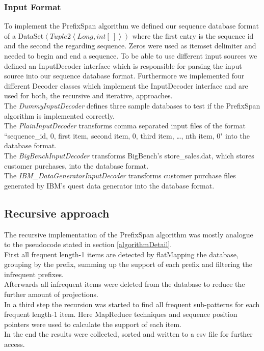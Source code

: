 \documentclass[a4paper,10pt,twocolumn]{article}
\begin{document}
\subsubsection*{Input Format}
To implement the PrefixSpan algorithm we defined our sequence database format of a DataSet$\left\langle Tuple2\left\langle Long,int[\ ]\right\rangle\right\rangle $ where the first entry is the sequence id and the second the regarding sequence. Zeros were used as itemset delimiter and needed to begin and end a sequence. To be able to use different input sources we defined an InputDecoder interface which is responsible for parsing the input source into our sequence database format. Furthermore we implemented four different Decoder classes which implement the InputDecoder interface and are used for both, the recursive and iterative, approaches.\\
The \textit{DummyInputDecoder} defines three sample databases to test if the PrefixSpan algorithm is implemented correctly.\\
The \textit{PlainInputDecoder} transforms comma separated input files of the format ``sequence\_id, 0, first item, second item, 0, third item, \dots, nth item, 0" into the database format.\\
The \textit{BigBenchInputDecoder} transforms BigBench's \cite{BigBench} store\_sales.dat, which stores customer purchases, into the database format.\\
The \textit{IBM\_DataGeneratorInputDecoder} transforms customer purchase files generated by IBM's quest data generator \cite{IBMDataGenerator} into the database format.

\subsection{Recursive approach}
The recursive implementation of the PrefixSpan algorithm was mostly analogue to the pseudocode stated in section \ref{algorithmDetail}.\\
First all frequent length-1 items are detected by flatMapping the database, grouping by the prefix, summing up the support of each prefix and filtering the infrequent prefixes.\\
Afterwards all infrequent items were deleted from the database to reduce the further amount of projections.\\
In a third step the recursion was started to find all frequent sub-patterns for each frequent length-1 item. Here MapReduce techniques and sequence position pointers were used to calculate the support of each item.\\
In the end the results were collected, sorted and written to a csv file for further access.
\end{document}
